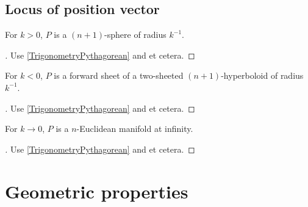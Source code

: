 \documentclass[stu, babel, american, biblatex, a4paper, draftall]{apa7}
\begin{document}
\subsection{Locus of position vector}
\begin{lemma}\label{SphericalLocus}
    For $k>0$, $P$ is a $\left(n+1\right)$-sphere of radius $k^{-1}$.
\end{lemma}
\begin{proof}[]
    \skipped

    Use \cref{TrigonometryPythagorean} and et cetera.
\end{proof}
\begin{lemma}\label{HyperbolicLocus}
    For $k<0$, $P$ is a forward sheet of a two-sheeted $\left(n+1\right)$-hyperboloid of radius $k^{-1}$.
\end{lemma}
\begin{proof}[]
    \skipped

    Use \cref{TrigonometryPythagorean} and et cetera.
\end{proof}
\begin{lemma}\label{EuclideanLocus}
    For $k\to0$, $P$ is a $n$-Euclidean manifold at infinity.
\end{lemma}
\begin{proof}[]
    \skipped

    Use \cref{TrigonometryPythagorean} and et cetera.
\end{proof}
\section{Geometric properties}
\end{document}
